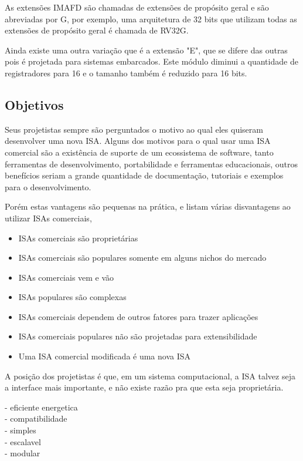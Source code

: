 	As extensões IMAFD são chamadas de extensões de propósito geral e são abreviadas por G, por exemplo, uma arquitetura de 32 bits que utilizam todas as extensões de propósito geral é chamada de RV32G.

	Ainda existe uma outra variação que é a extensão "E", que se difere das outras pois é projetada para sistemas embarcados. Este módulo diminui a quantidade de registradores para 16 e o tamanho também é reduzido para 16 bits.

	\subsection{Objetivos}

		Seus projetistas sempre são perguntados o motivo ao qual eles quiseram desenvolver uma nova ISA. Alguns dos motivos para o qual usar uma ISA comercial são a existência de suporte de um ecossistema de software, tanto ferramentas de desenvolvimento, portabilidade e ferramentas educacionais, outros benefícios seriam a grande quantidade de documentação, tutoriais e exemplos para o desenvolvimento.

		Porém estas vantagens são pequenas na prática, e listam várias disvantagens ao utilizar ISAs comerciais,

		\begin{itemize}
			\item ISAs comerciais são proprietárias
			\item ISAs comerciais são populares somente em alguns nichos do mercado
			\item ISAs comerciais vem e vão
			\item ISAs populares são complexas
			\item ISAs comerciais dependem de outros fatores para trazer aplicações
			\item ISAs comerciais populares não são projetadas para extensibilidade
			\item Uma ISA comercial modificada é uma nova ISA
		\end{itemize}

		A posição dos projetistas é que, em um sistema computacional, a ISA talvez seja a interface mais importante, e não existe razão pra que esta seja proprietária.~\cite{Waterman:EECS-2016-1}



			- eficiente energetica\\
			- compatibilidade\\
			- simples\\
			- escalavel\\
			- modular\\




